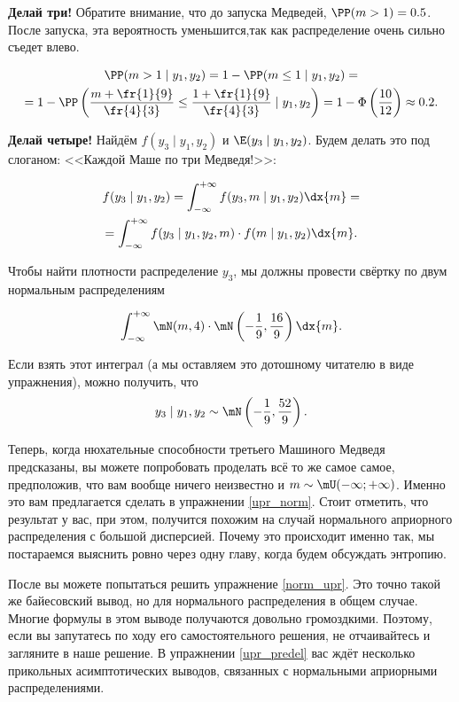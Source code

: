 \textbf{Делай три!} Обратите внимание, что до запуска Медведей, $\PP(m > 1) = 0.5$. После запуска, эта вероятность уменьшится,так как распределение очень сильно съедет влево.

\begin{multline*}
\PP(m > 1 \mid y_1,y_2) = 1 - \PP( m \le 1 \mid y_1,y_2) = \\ = 1 - \PP\left( \frac{m + \fr{1}{9}}{\fr{4}{3}} \le \frac{1 + \fr{1}{9}}{\fr{4}{3}} \mid  y_1, y_2 \right) = 1 - \Phi\left(\frac{10}{12}\right) \approx 0.2.
\end{multline*}


\textbf{Делай четыре!} Найдём $f(y_3 \mid y_1,y_2)$ и $\E(y_3 \mid y_1,y_2)$. Будем делать это под слоганом: <<Каждой Маше по три Медведя!>>:


\begin{multline*}
 f(y_3 \mid y_1,y_2)  = \int_{-\infty}^{+\infty} f(y_3, m \mid y_1,y_2)\dx{m} = \\ = \int_{-\infty}^{+\infty}  f(y_3 \mid y_1,y_2,m) \cdot f(m \mid y_1,y_2) \dx{m}.
\end{multline*}

Чтобы найти плотности распределение $y_3$, мы должны провести свёртку по двум нормальным распределениям

\[ \int_{-\infty}^{+\infty} \mN(m,4)\cdot \mN \left (-\frac{1}{9},\frac{16}{9} \right)\dx{m}.\]  

Если взять этот интеграл (а мы оставляем это дотошному читателю в виде упражнения),  можно получить, что \[y_3 \mid y_1,y_2 \sim \mN \left(-\frac{1}{9},\frac{52}{9} \right).\]

Теперь, когда нюхательные способности третьего Машиного Медведя предсказаны, вы можете попробовать проделать всё то же самое самое, предположив, что вам вообще ничего неизвестно и $m \sim \mU(-\infty; +\infty)$. Именно это вам предлагается сделать в упражнении \ref{upr_norm}. Стоит отметить, что результат у вас, при этом, получится похожим на случай нормального априорного распределения с большой дисперсией. Почему это происходит именно так, мы постараемся выяснить ровно через одну главу, когда будем обсуждать энтропию.

После вы можете попытаться решить упражнение \ref{norm_upr}. Это точно такой же байесовский вывод, но для нормального распределения в общем случае. Многие формулы в этом выводе получаются довольно громоздкими. Поэтому, если вы запутатесь по ходу его самостоятельного решения, не отчаивайтесь и загляните в наше решение. В упражнении \ref{upr_predel} вас ждёт несколько прикольных асимптотических выводов, связанных с нормальными априорными распределениями. 



